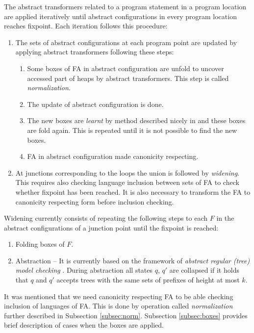 The abstract transformers related to a program statement in a program location are applied iteratively until
abstract configurations in every program location reaches fixpoint.
Each iteration follows this procedure:
\begin{enumerate}
		\item The sets of abstract configurations at each program point are updated by applying abstract transformers following
			these steps:
			\begin{enumerate}
				\item Some boxes of FA in abstract configuration are unfold to uncover accessed part of heaps by abstract transformers.
					This step is called \emph{normalization}.
				\item The update of abstract configuration is done.
				\item The new boxes are \emph{learnt} by method described nicely in \cite{forester13}
					and these boxes are fold again.
					This is repeated until it is not possible to find the new boxes.
				\item FA in abstract configuration made canonicity respecting.
			\end{enumerate}
		\item At junctions corresponding to the loops the union is followed by \emph{widening}.
			This requires also checking language inclusion between sets of FA to check whether fixpoint has been reached.
			It is also necessary to transform the FA to canonicity respecting form before inclusion checking.
\end{enumerate}

Widening currently consists of repeating the following steps to each $F$ in the abstract configurations of a junction point until the fixpoint is reached:
\begin{enumerate}
		\item Folding boxes of $F$.
		\item Abstraction -- It is currently based on the framework of \emph{abstract regular (tree) model checking} \cite{artmc}.
			During abstraction all states $q$, $q'$ are collapsed if it holds that
			$q$ and $q'$ accepts trees with the same sets of prefixes of height at most $k$.
\end{enumerate}

It was mentioned that we need canonicity respecting FA to be able checking inclusion of languages of FA.
This is done by operation called \emph{normalization} further described in Subsection \ref{subsec:norm}.
Subsection \ref{subsec:boxes} provides brief description of cases when the boxes are applied.

